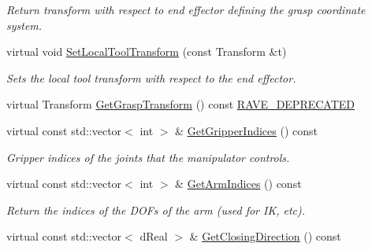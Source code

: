 \begin{DoxyCompactItemize}
\begin{DoxyCompactList}\small\item\em Return transform with respect to end effector defining the grasp coordinate system. \item\end{DoxyCompactList}\item 
virtual void \hyperlink{classOpenRAVE_1_1RobotBase_1_1Manipulator_a853353ac859599b30cee9e99b17fa728}{SetLocalToolTransform} (const Transform \&t)
\begin{DoxyCompactList}\small\item\em Sets the local tool transform with respect to the end effector. \item\end{DoxyCompactList}\item 
virtual Transform \hyperlink{classOpenRAVE_1_1RobotBase_1_1Manipulator_a427344bec7ce8135433b47fd0b04f1f4}{GetGraspTransform} () const \hyperlink{classOpenRAVE_1_1RobotBase_ad7131b2e388f7f953e9cc14f7336c8e2}{RAVE\_\-DEPRECATED}
\item 
\hypertarget{classOpenRAVE_1_1RobotBase_1_1Manipulator_af77d0225ce1ef4be58ca978d1cd13f10}{
virtual const std::vector$<$ int $>$ \& \hyperlink{classOpenRAVE_1_1RobotBase_1_1Manipulator_af77d0225ce1ef4be58ca978d1cd13f10}{GetGripperIndices} () const }
\label{classOpenRAVE_1_1RobotBase_1_1Manipulator_af77d0225ce1ef4be58ca978d1cd13f10}

\begin{DoxyCompactList}\small\item\em Gripper indices of the joints that the manipulator controls. \item\end{DoxyCompactList}\item 
virtual const std::vector$<$ int $>$ \& \hyperlink{classOpenRAVE_1_1RobotBase_1_1Manipulator_ade23a90fcb4102d98f20dddad76ded75}{GetArmIndices} () const 
\begin{DoxyCompactList}\small\item\em Return the indices of the DOFs of the arm (used for IK, etc). \item\end{DoxyCompactList}\item 
\hypertarget{classOpenRAVE_1_1RobotBase_1_1Manipulator_a29109f7d70f0066ba24f7b5ef6deb835}{
virtual const std::vector$<$ dReal $>$ \& \hyperlink{classOpenRAVE_1_1RobotBase_1_1Manipulator_a29109f7d70f0066ba24f7b5ef6deb835}{GetClosingDirection} () const }
\label{classOpenRAVE_1_1RobotBase_1_1Manipulator_a29109f7d70f0066ba24f7b5ef6deb835}


\end{DoxyCompactItemize}
